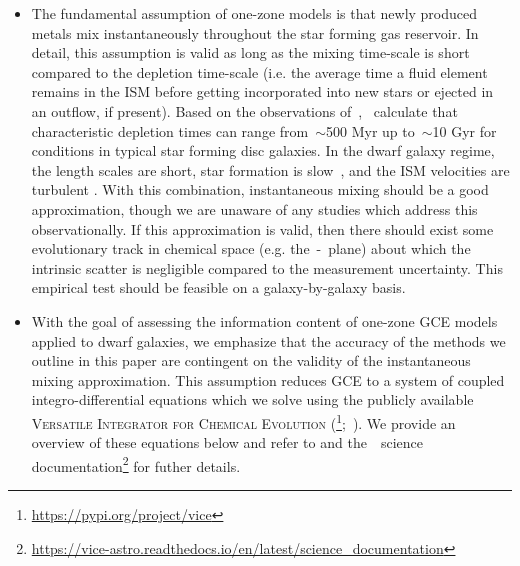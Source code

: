 \documentclass[ms.tex]{subfiles}
\begin{document}
\begin{itemize}

	\item The fundamental assumption of one-zone models is that newly produced
	metals mix instantaneously throughout the star forming gas reservoir.
	In detail, this assumption is valid as long as the mixing time-scale
	is short compared to the depletion time-scale (i.e. the average time a
	fluid element remains in the ISM before getting incorporated into new
	stars or ejected in an outflow, if present).
	Based on the observations of~\citet{Leroy2008},~\citet*{Weinberg2017}
	calculate that characteristic depletion times can range from~$\sim$500 Myr
	up to~$\sim$10 Gyr for conditions in typical star forming disc galaxies.
	In the dwarf galaxy regime, the length scales are short, star formation
	is slow~\citep[e.g.][]{Hudson2015}, and the ISM velocities are turbulent
	\citep{Dutta2009, Stilp2013, Schleicher2016}.
	With this combination, instantaneous mixing should be a good approximation,
	though we are unaware of any studies which address this observationally.
	If this approximation is valid, then there should exist some evolutionary
	track in chemical space (e.g. the~\afe-\feh~plane) about which the
	intrinsic scatter is negligible compared to the measurement uncertainty.
	This empirical test should be feasible on a galaxy-by-galaxy basis.

	\item With the goal of assessing the information content of one-zone GCE
	models applied to dwarf galaxies, we emphasize that the accuracy of the
	methods we outline in this paper are contingent on the validity of the
	instantaneous mixing approximation.
	This assumption reduces GCE to a system of coupled integro-differential
	equations which we solve using the publicly available
	\textsc{Versatile Integrator for Chemical Evolution} (\vice\footnote{
		\url{https://pypi.org/project/vice}
	};~\citealp{Johnson2020}).
	We provide an overview of these equations below and refer to
	\citet{Johnson2020} and the~\vice~science documentation\footnote{
		\url{https://vice-astro.readthedocs.io/en/latest/science_documentation}
	} for futher details.


\end{itemize}
\end{document}
